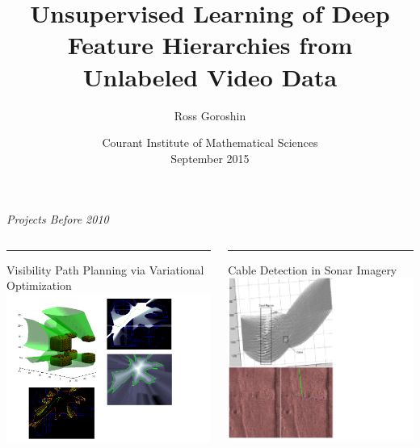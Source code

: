 \documentclass{beamer}
\title{Unsupervised Learning of Deep Feature Hierarchies from Unlabeled Video Data}
\date{ \tiny Courant Institute of Mathematical Sciences \\ \vspace{0.33cm} \tiny September 2015}
\author{Ross Goroshin}
\begin{document}
\begin{frame}
\titlepage
\end{frame}

\begin{frame}
\begin{center} 
\huge \color{blue} \emph{Projects Before 2010}
\end{center} 
\end{frame} 

\begin{frame}
\begin{columns}[T] %
\begin{column}{.33\textwidth}
\color{blue}\rule{\linewidth}{2pt}
\tiny{Visibility Path Planning via Variational Optimization }
\includegraphics[scale=0.3,trim = 1 30 1 1, clip]{./Figures/vis.pdf}
\end{column}%
\hfill%
\begin{column}{.33\textwidth}
\color{blue}\rule{\linewidth}{2pt}
\tiny{Cable Detection in Sonar Imagery}
\centering
\includegraphics[scale=0.30,trim = 1 1 200 40, clip]{./Figures/cable.pdf}

\end{column}
\end{columns}
\end{frame}
\end{document}
